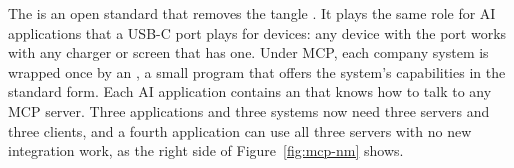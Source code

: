 The  is an open standard that removes the tangle \citep{mcp2026spec}. It plays the same role for AI applications that a USB-C port plays for devices: any device with the port works with any charger or screen that has one. Under MCP, each company system is wrapped once by an , a small program that offers the system's capabilities in the standard form. Each AI application contains an  that knows how to talk to any MCP server. Three applications and three systems now need three servers and three clients, and a fourth application can use all three servers with no new integration work, as the right side of Figure~\ref{fig:mcp-nm} shows.


